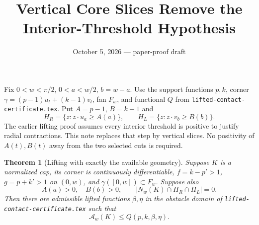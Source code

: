 \documentclass[11pt]{article}
\title{Vertical Core Slices Remove the Interior-Threshold Hypothesis}
\author{}\date{October 5, 2026 --- paper-proof draft}
\newtheorem{theorem}{Theorem}
\begin{document}
\maketitle

Fix $0<w<\pi/2$, $0<a<w/2$, $b=w-a$. Use the support functions $p,k$, corner $\gamma=(p-1)u_t+(k-1)v_t$, fan $F_w$, and functional $Q$ from \texttt{lifted-contact-certificate.tex}. Put $A=p-1$, $B=k-1$ and
\[
 H_R=\{z:z\cdot u_a\ge A(a)\},\qquad
 H_L=\{z:z\cdot v_b\ge B(b)\}.
\]
The earlier lifting proof assumes every interior threshold is positive to justify radial contractions. This note replaces that step by vertical slices. No positivity of $A(t),B(t)$ away from the two selected cuts is required.

\begin{theorem}[Lifting with exactly the available geometry]\label{thm:lift}
Suppose $K$ is a normalized cap, its corner is continuously differentiable, $f=k-p'>1$, $g=p+k'>1$ on $(0,w)$, and $\gamma([0,w])\subset F_w$. Suppose also
\[
 A(a)>0,\quad B(b)>0,\qquad |N_w(K)\cap H_R\cap H_L|=0.
\]
Then there are admissible lifted functions $\beta,\eta$ in the obstacle domain of \texttt{lifted-contact-certificate.tex} such that
\[
 \mathcal A_w(K)\le Q(p,k,\beta,\eta).
\]
\end{theorem}
\end{document}
